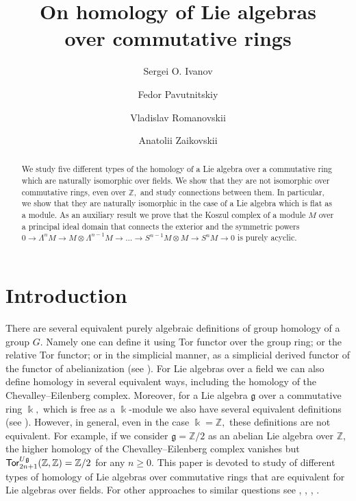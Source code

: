 \documentclass{amsart}
\title[On homology of Lie algebras]{On homology of Lie algebras \\ over commutative rings}
\author[Ivanov]{Sergei O. Ivanov}
\author[Pavutnitskiy]{Fedor Pavutnitskiy}
\author[Romanovskii]{Vladislav Romanovskii}
\author[Zaikovskii]{Anatolii Zaikovskii}
\numberwithin{equation}{section}
\theoremstyle{definition}
\def\gg{\mathfrak{g}}
\def\kk{\Bbbk}
\def\ZZ{\mathbb{Z}}
\begin{document}
\maketitle

\begin{abstract}
We study five different types of the homology of a Lie algebra over a commutative ring which are naturally isomorphic over fields. We show that they are not isomorphic over commutative rings, even over $\mathbb Z,$ and study connections between them. In particular, we show that they are naturally isomorphic in the case of a Lie algebra which is flat as a module.
As an auxiliary result we prove that the Koszul complex of a module $M$ over a principal ideal domain that connects the exterior and the symmetric powers  $0\to \Lambda^n M\to M \otimes \Lambda^{n-1} M \to \dots \to  S^{n-1}M \otimes M \to S^nM\to 0 $ is purely acyclic. 
\end{abstract}


\section*{Introduction} 

There are several equivalent purely algebraic definitions of group homology of a group $G.$ Namely one can define it using Tor functor over the group ring; or the relative Tor functor; or in the simplicial manner, as a simplicial derived functor of the functor of abelianization
(see \cite[Ch. II, \S 5]{quillen2006homotopical}). For Lie algebras over a field we can also define homology in several equivalent ways, including the homology of the  Chevalley–Eilenberg complex. Moreover, for a Lie algebra $\gg$ over a commutative ring $\kk,$ which is free as a $\kk$-module we also have several equivalent definitions (see \cite[Ch. XIII]{cartan1999homological}). However, in general, even in the case $\kk=\ZZ,$ these definitions are not equivalent. For example, if we consider $\gg=\ZZ/2$ as an abelian Lie algebra over $\ZZ,$ the higher homology of the Chevalley–Eilenberg complex vanishes but ${\sf Tor}_{2n+1}^{U\gg}(\ZZ,\ZZ)=\ZZ/2$ for any $n\geq 0.$  This paper is devoted to study of different types of homology of Lie algebras over commutative rings that are equivalent for Lie algebras over fields. For other approaches to similar questions see  \cite{dixmier1957homologie}, \cite{pirashvili2003algebra}, \cite{shukla1961cohomologie}, \cite{quillen1970co}.
\end{document}
